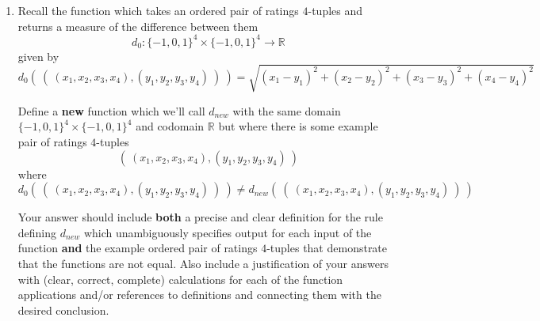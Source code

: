 \begin{enumerate}[labelindent=0pt, leftmargin=0pt]
\begin{enumerate}
\begin{enumerate}
\item $$\{ n \in \mathbb{Z}^+ \mid n \leq 3 \} \times \{ m \in \mathbb{N} \mid m \leq 3\}$$
\item The set $X$ defined recursively as 
    \[
    \begin{array}{ll}
    \textrm{Basis Step: } & 1 \in X, 3 \in X, 5 \in X \\
    \textrm{Recursive Step: } & \textrm{If the integer } n \in X \textrm{, then the result of multiplying } n \textrm{ by } -1 \textrm{ is in }X
    \end{array}
    \]
\item $$\{ x \in S \mid rnalen(x) = 2 \} \circ \{x \in S \mid rnalen(x) = 0 \}$$
where $S$ is the set of RNA strands and $rnalen$ is the recursively defined
function that we discussed in class,
\[
\begin{array}{llll}
& & \textit{rnalen} : S & \to \mathbb{Z}^+ \\
\textrm{Basis Step:} & \textrm{If } b \in B\textrm{ then } & \textit{rnalen}(b) & = 1 \\
\textrm{Recursive Step:} & \textrm{If } s \in S\textrm{ and }b \in B\textrm{, then  } & \textit{rnalen}(sb) & = 1 + \textit{rnalen}(s)
\end{array}
\]
\item $$\{ (r,g,b) \in C \mid r+g+b = 2 \textrm{ and } g=1\}$$ where 
$C = \{ (r,g,b) \mid 0 \leq r \leq 255, 0 \leq g \leq 255, 0 \leq b \leq 255, r \in \mathbb{N}, g \in \mathbb{N}, b \in \mathbb{N} \}$.
\end{enumerate}

\item Recall the function which takes an ordered pair of ratings $4$-tuples and returns a measure of the difference between them
\[
    d_0: \{-1,0,1\}^4 \times \{-1,0,1\}^4 \to \mathbb{R}
\]
given by
\[
d_0 (~(~ (x_1, x_2, x_3, x_4), (y_1, y_2, y_3, y_4) ~) ~) = \sqrt{ (x_1 - y_1)^2 + (x_2 - y_2)^2 + (x_3 -y_3)^2 + (x_4 -y_4)^2}
\]

Define a {\bf new} function which we'll call $d_{new}$ with the same domain $\{-1,0,1\}^4 \times \{-1,0,1\}^4$
and codomain $\mathbb{R}$ but where there is some example pair of ratings $4$-tuples 
\[(~ (x_1, x_2, x_3, x_4), (y_1, y_2, y_3, y_4)~)\]
where
\[
d_0 (~(~ (x_1, x_2, x_3, x_4), (y_1, y_2, y_3, y_4) ~) ~) \neq d_{new} (~(~ (x_1, x_2, x_3, x_4), (y_1, y_2, y_3, y_4) ~) ~)
\]

    Your answer should include  {\bf both} a precise and clear definition for the rule defining
    $d_{new}$ which unambiguously specifies output for each input of the function {\bf and}
    the example ordered pair of ratings $4$-tuples that demonstrate that the functions are not equal.
    Also include a justification 
    of your answers with (clear, correct, complete) calculations for each of the function applications 
    and/or references to definitions and connecting them with
    the desired conclusion.


\end{enumerate}
\end{enumerate}
